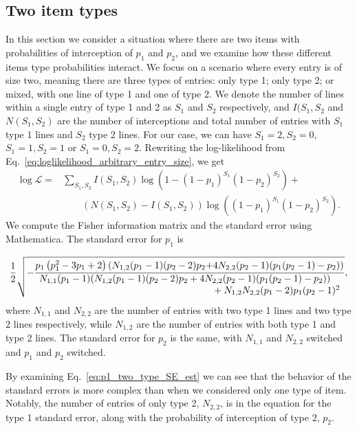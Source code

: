 \documentclass{article}
\begin{document}
\subsection{Two item types}
In this section we consider a situation where there are two items with probabilities of interception of \(p_1\) and \(p_2\), and we examine how these different items type probabilities interact. We focus on a scenario where every entry is of size two, meaning there are three types of entries: only type 1; only type 2; or mixed, with one line of type 1 and one of  type 2. We denote the number of lines within a single entry of type 1 and 2 as \(S_1\) and \(S_2\) respectively, and \(I(S_1,S_2\) and \(N(S_1,S_2)\) are the number of interceptions and total number of entries with \(S_1\) type 1 lines and \(S_2\) type 2 lines. For our case, we can have \(S_1=2, S_2=0\), \(S_1=1, S_2=1\) or \(S_1=0, S_2=2\). Rewriting the log-likelihood from Eq.~\eqref{eq:loglikelihood_arbitrary_entry_size}, we get
\begin{align}
\log\mathcal{L} =& \sum_{S_1,S_2}{I(S_1,S_2)}\log\left(1-(1-p_1)^{S_1}(1-p_2)^{S_2}\right) + \nonumber
\\ &\quad\quad(N(S_1,S_2)-I(S_1,S_2))\log\left((1-p_1)^{S_1}(1-p_2)^{S_2}\right). \label{eq:entry_mode_loglike_2types}
\end{align}
We compute the Fisher information matrix and the standard error using Mathematica. The standard error for \(p_1\) is

\begin{align}
\frac{1 }
{2}
\sqrt{
-\frac{\textstyle{{p_1} \left(p_1^2-3 p_1+2\right) (N_{1,2} (p_1-1) (p_2-2) p_2}{+4 N_{2,2} (p_2-1) (p_1 (p_2-1)-p_2))}}
{\splitfrac{N_{1,1} (p_1-1) (N_{1,2} (p_1-1) (p_2-2) p_2+4 N_{2,2} (p_2-1) (p_1 (p_2-1)-p_2))}{+N_{1,2} N_{2,2} (p_1-2) p_1 (p_2-1)^2}}
}
,\label{eq:p1_two_type_SE_est}
\end{align}
where \(N_{1,1}\) and \(N_{2,2}\) are the number of entries with two type 1 lines and two type 2 lines respectively, while \(N_{1,2}\) are the number of entries with both type 1 and type 2 lines. The standard error for \(p_2\) is the same, with \(N_{1,1}\) and \(N_{2,2}\) switched and \(p_1\) and \(p_2\) switched. 

By examining Eq.~\eqref{eq:p1_two_type_SE_est} we can see that the behavior of the standard errors is more complex than when we considered only one type of item. Notably, the number of entries of only type 2, \(N_{2,2}\), is in the equation for the type 1 standard error, along with the probability of interception of type 2, \(p_2\). 
\end{document}
